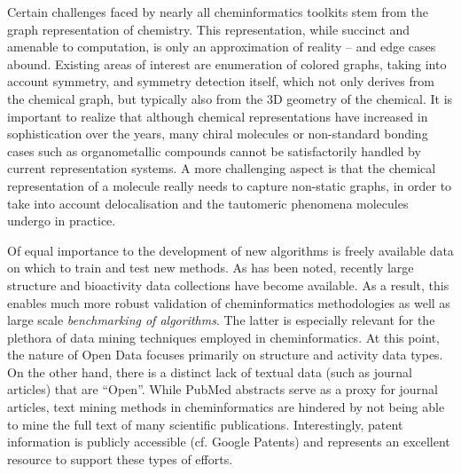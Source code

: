 \documentclass{sig-alternate}
\begin{document}
Certain challenges faced by nearly all cheminformatics toolkits stem
from the graph representation of chemistry. This representation, while
succinct and amenable to computation, is only an approximation of
reality -- and edge cases abound. Existing areas of interest are
enumeration of colored graphs, taking into account symmetry, and
symmetry detection itself, which not only derives from the chemical
graph, but typically also from the 3D geometry of the chemical. It is
important to realize that although chemical representations have
increased in sophistication over the years, many chiral molecules or
non-standard bonding cases such as organometallic compounds cannot be
satisfactorily handled by current representation systems. A more
challenging aspect is that the chemical representation of a molecule
really needs to capture non-static graphs, in order to take into
account delocalisation and the tautomeric phenomena molecules undergo
in practice.

Of equal importance to the development of new algorithms is freely
available data on which to train and test new methods. As has been
noted, recently large structure and bioactivity data collections have
become available. As a result, this enables much more robust
validation of cheminformatics methodologies as well as large scale
\emph{benchmarking of algorithms}. The latter is especially relevant
for the plethora of data mining techniques employed in
cheminformatics. At this point, the nature of Open Data focuses
primarily on structure and activity data types. On the other hand,
there is a distinct lack of textual data (such as journal articles)
that are ``Open''. While PubMed abstracts serve as a proxy
for journal articles, text mining methods in cheminformatics are
hindered by not being able to mine the full text of many scientific
publications.  Interestingly, patent information is publicly
accessible (cf. Google Patents) and represents an excellent resource
to support these types of efforts.

%
\end{document}
